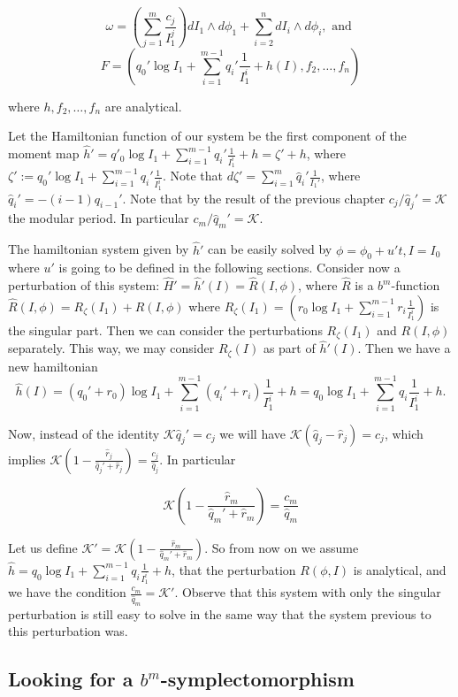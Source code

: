 $$\omega = \left(\sum_{j=1}^{m}\frac{c_j}{I_1^j}\right) d I_1 \wedge d\phi_1 + \sum_{i=2}^n dI_i\wedge d\phi_i, \text{ and }$$
$$F = (q_0' \log I_1 + \sum_{i=1}^{m-1} q_i'\frac{1}{I_1^i} + h(I), f_2, \ldots, f_n)$$

where $h,f_2,\ldots,f_n$ are analytical.

Let the Hamiltonian function of our system be the first component of the moment map $\hat h' = q'_0\log I_1 + \sum_{i=1}^{m-1} q_i'\frac{1}{I_1^i} + h = \zeta' + h$, where $\zeta' := q_0' \log I_1 + \sum_{i=1}^{m-1} q_i' \frac{1}{I_1^i}$. Note that $d\zeta' = \sum_{i=1}^m \hat q_i'\frac{1}{I_1'}$, where $\hat q_i ' = -(i-1)q_{i-1}'$. Note that by the result of the previous chapter $c_j/\hat q_j ' = \mathcal{K}$ the modular period. In particular $c_m/\hat q_m ' = \mathcal{K}$.

The hamiltonian system given by $\hat h'$ can be easily solved by $\phi = \phi_0 + u' t, I = I_0$ where $u'$ is going to be defined in the following sections.
Consider now a perturbation of this system: $\hat H' = \hat h'(I) = \hat R(I,\phi)$, where $\hat R$ is a $b^m$-function $\hat R(I,\phi) = R_{\zeta}(I_1) + R(I,\phi)$ where $R_\zeta(I_1) = (r_0 \log I_1 + \sum_{i=1}^{m-1} r_i \frac{1}{I_1^i})$ is the singular part. Then we can consider the perturbations $R_\zeta(I_1)$ and $R(I,\phi)$ separately. This way, we may consider $R_\zeta(I)$ as part of $\hat h'(I)$. Then we have a new hamiltonian
$$\hat h(I) = (q_0' + r_0) \log I_1 + \sum_{i=1}^{m-1}(q_i' + r_i)\frac{1}{I_1^i} + h = q_0 \log I_1 + \sum_{i=1}^{m-1} q_i \frac{1}{I_1^i} + h.$$

Now, instead of the identity $\mathcal{K} \hat q_j' = c_j$ we will have $\mathcal{K} (\hat q_j - \hat r_j) = c_j$, which implies $\mathcal{K}\left(1 - \frac{\hat r_j}{\hat q_j ' + \hat r_j}\right) = \frac{c_j}{\hat q_j}$. In particular

$$\mathcal{K}\left(1 - \frac{\hat r_m}{\hat q_m ' + \hat r_m}\right) = \frac{c_m}{\hat q_m}$$

Let us define $\mathcal{K}' = \mathcal{K}\left(1 - \frac{\hat r_m}{\hat q_m ' + \hat r_m}\right)$.
So from now on we assume $\hat h = q_0 \log I_1 + \sum_{i=1}^{m-1} q_i \frac{1}{I_1^i} + h$, that the perturbation $R(\phi,I)$ is analytical, and we have the condition $\frac{c_m}{\hat q_m} = \mathcal{K}'$. Observe that this system with only the singular perturbation is still easy to solve in the same way that the system previous to this perturbation was.

\subsection{Looking for a $b^m$-symplectomorphism}

